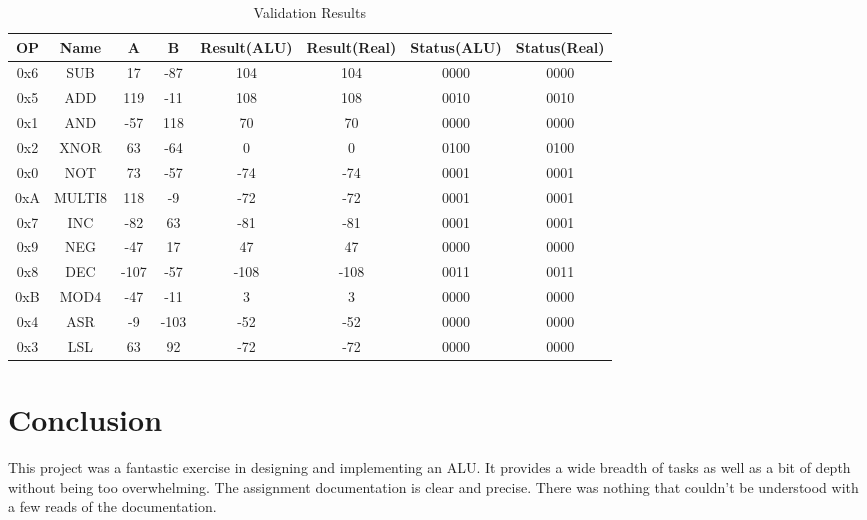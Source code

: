 \documentclass[12pt,letterpaper,titlepage]{article}
\begin{document}
\begin{raggedright}
\begin{table}[ht]
\centering
\begin{tabular}{|c||c|c|c|c|c|c|c|}\hline
OP & Name & A & B & Result(ALU) & Result(Real) & Status(ALU) & Status(Real) \\\hline\hline
0x6    & SUB       &        17 &       -87 &         104 &               104 &        0000 & 0000              \\\hline
0x5    & ADD       &       119 &       -11 &         108 &               108 &        0010 & 0010              \\\hline
0x1    & AND       &       -57 &       118 &          70 &                70 &        0000 & 0000              \\\hline
0x2    & XNOR      &        63 &       -64 &           0 &                 0 &        0100 & 0100              \\\hline
0x0    & NOT       &        73 &       -57 &         -74 &               -74 &        0001 & 0001              \\\hline
0xA    & MULTI8    &       118 &        -9 &         -72 &               -72 &        0001 & 0001              \\\hline
0x7    & INC       &       -82 &        63 &         -81 &               -81 &        0001 & 0001              \\\hline
0x9    & NEG       &       -47 &        17 &          47 &                47 &        0000 & 0000              \\\hline
0x8    & DEC       &      -107 &       -57 &        -108 &              -108 &        0011 & 0011              \\\hline
0xB    & MOD4      &       -47 &       -11 &           3 &                 3 &        0000 & 0000              \\\hline
0x4    & ASR       &        -9 &      -103 &         -52 &               -52 &        0000 & 0000              \\\hline
0x3    & LSL       &        63 &        92 &         -72 &               -72 &        0000 & 0000              \\\hline
\end{tabular}
\caption{Validation Results}\label{valres}
\end{table}


\section{Conclusion}
This project was a fantastic exercise in designing and implementing an ALU. It provides a wide breadth of tasks as well as a bit of depth without being too overwhelming. The assignment documentation is clear and precise. There was nothing that couldn't be understood with a few reads of the documentation.


\end{raggedright}
\end{document}
